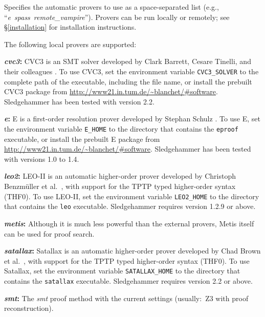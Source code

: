 \documentclass[a4paper,12pt]{article}
\newcommand\download{\url{http://www21.in.tum.de/~blanchet/\#software}}
\begin{document}
\begin{enum}
Specifies the automatic provers to use as a space-separated list (e.g.,
``\textit{e}~\textit{spass}~\textit{remote\_vampire\/}'').
Provers can be run locally or remotely; see \S\ref{installation} for
installation instructions.

The following local provers are supported:

\begin{enum}
\item[\labelitemi] \textbf{\textit{cvc3}:} CVC3 is an SMT solver developed by
Clark Barrett, Cesare Tinelli, and their colleagues \cite{cvc3}. To use CVC3,
set the environment variable \texttt{CVC3\_SOLVER} to the complete path of the
executable, including the file name, or install the prebuilt CVC3 package from
\download. Sledgehammer has been tested with version 2.2.

\item[\labelitemi] \textbf{\textit{e}:} E is a first-order resolution prover
developed by Stephan Schulz \cite{schulz-2002}. To use E, set the environment
variable \texttt{E\_HOME} to the directory that contains the \texttt{eproof}
executable, or install the prebuilt E package from \download. Sledgehammer has
been tested with versions 1.0 to 1.4.

\item[\labelitemi] \textbf{\textit{leo2}:} LEO-II is an automatic
higher-order prover developed by Christoph Benzm\"uller et al.\ \cite{leo2},
with support for the TPTP typed higher-order syntax (THF0). To use LEO-II, set
the environment variable \texttt{LEO2\_HOME} to the directory that contains the
\texttt{leo} executable. Sledgehammer requires version 1.2.9 or above.

\item[\labelitemi] \textbf{\textit{metis}:} Although it is much less powerful than
the external provers, Metis itself can be used for proof search.

\item[\labelitemi] \textbf{\textit{satallax}:} Satallax is an automatic
higher-order prover developed by Chad Brown et al.\ \cite{satallax}, with
support for the TPTP typed higher-order syntax (THF0). To use Satallax, set the
environment variable \texttt{SATALLAX\_HOME} to the directory that contains the
\texttt{satallax} executable. Sledgehammer requires version 2.2 or above.

\item[\labelitemi] \textbf{\textit{smt}:} The \textit{smt} proof method with the
current settings (usually:\ Z3 with proof reconstruction).


\end{enum}
\end{enum}
\end{document}
